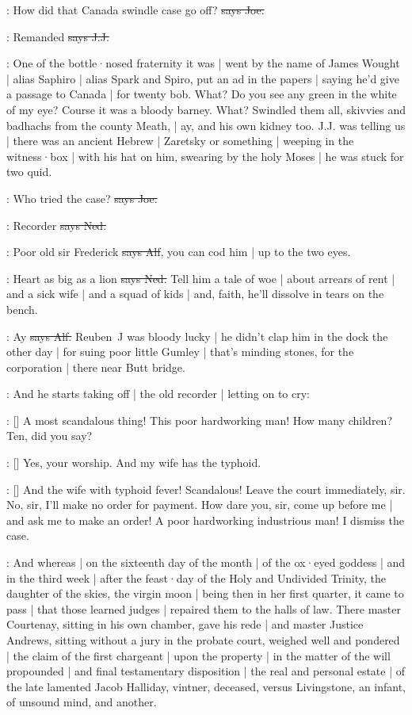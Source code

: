 \joe:
How did that Canada swindle case go off?
\sout{says Joe.}

\jjom:
Remanded
\sout{says J.J.}

\Nq:
One of the bottle·nosed fraternity it was |
went by the name of James Wought |
alias Saphiro |
alias Spark and Spiro,
put an ad in the papers |
saying he'd give a passage to Canada |
for twenty bob.
What?
Do you see any green in the white of my eye?
Course it was a bloody barney.
What?
Swindled them all,
skivvies and badhachs from the county Meath,
 |
ay,
and his own kidney too.
J.J. was telling us |
there was an ancient Hebrew |
Zaretsky or something |
weeping in the witness·box |
with his hat on him,
swearing by the holy Moses |
he was stuck for two quid.

\joe:
Who tried the case?
\sout{says Joe.}

\lambert:
Recorder
\sout{says Ned.}

\bergan:
Poor old sir Frederick
\sout{says Alf},
you can cod him |
up to the two eyes.

\lambert:
Heart as big as a lion
\sout{says Ned.}
Tell him a tale of woe |
about arrears of rent |
and a sick wife |
and a squad of kids |
and,
faith,
he'll dissolve in tears on the bench.

\bergan:
Ay
\sout{says Alf.}
Reuben~J was bloody lucky |
he didn't clap him in the dock the other day |
for suing poor little Gumley |
that's minding stones,
for the corporation |
there near Butt bridge.

\Nq:
And he starts taking off |
the old recorder |
letting on to cry:

\bergan:
[]
A most scandalous thing!
This poor hardworking man!
How many children?
Ten,
did you say?

\bergan:
[]
Yes,
your worship.
And my wife has the typhoid.

\bergan:
[]
And the wife with typhoid fever!
Scandalous!
Leave the court immediately,
sir.
No,
sir,
I'll make no order for payment.
How dare you,
sir,
come up before me |
and ask me to make an order!
A poor hardworking industrious man!
I dismiss the case.

:
And whereas |
on the sixteenth day of the month |
of the ox·eyed goddess |
and in the third week |
after the feast·day of the Holy and Undivided Trinity,
the daughter of the skies,
the virgin moon |
being then in her first quarter,
it came to pass |
that those learned judges |
repaired them to the halls of law.
There master Courtenay,
sitting in his own chamber,
gave his rede |
and master Justice Andrews,
sitting without a jury in the probate court,
weighed well and pondered |
the claim of the first chargeant |
upon the property |
in the matter of the will propounded |
and final testamentary disposition |
 the real and personal estate |
of the late lamented Jacob Halliday,
vintner,
deceased,
versus Livingstone,
an infant,
of unsound mind,
and another.

